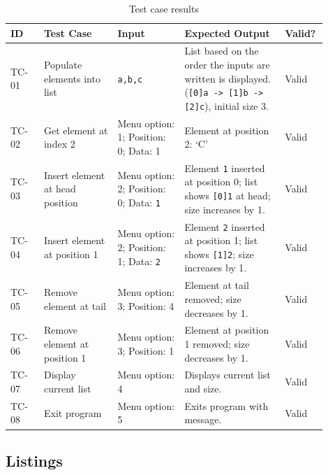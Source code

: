 \documentclass[12pt]{article}
\begin{document}
\begin{table}[H]
\centering
\begin{tabularx}{\linewidth}{@{}>{\raggedright\arraybackslash}p{0.10\linewidth}
                            >{\raggedright\arraybackslash}p{0.22\linewidth}
                            >{\raggedright\arraybackslash}p{0.20\linewidth}
                            >{\raggedright\arraybackslash}p{0.30\linewidth}
                            >{\raggedright\arraybackslash}p{0.08\linewidth}@{}}
\toprule
\textbf{ID} & \textbf{Test Case} & \textbf{Input} & \textbf{Expected Output} & \textbf{Valid?} \\
\midrule
TC-01 & Populate elements into list & \texttt{a,b,c} &
List based on the order the inputs are written is displayed.
(\texttt{[0]a -> [1]b -> [2]c}), initial size 3. &
Valid \\
\addlinespace
TC-02 & Get element at index 2 &
Menu option: 1; Position: 0; Data: 1 &
Element at position 2: ‘C’ &
Valid \\
\addlinespace
TC-03 & Insert element at head position &
Menu option: 2; Position: 0; Data: \texttt{1} &
Element \texttt{1} inserted at position 0; list shows \texttt{[0]1} at head; size increases by 1. &
Valid \\
\addlinespace
TC-04 & Insert element at position 1 &
Menu option: 2; Position: 1; Data: \texttt{2} &
Element \texttt{2} inserted at position 1; list shows \texttt{[1]2}; size increases by 1. &
Valid \\
\addlinespace
TC-05 & Remove element at tail &
Menu option: 3; Position: 4 &
Element at tail removed; size decreases by 1. &
Valid \\
\addlinespace
TC-06 & Remove element at position 1 &
Menu option: 3; Position: 1 &
Element at position 1 removed; size decreases by 1. &
Valid \\
\addlinespace
TC-07 & Display current list &
Menu option: 4 &
Displays current list and size. &
Valid \\
\addlinespace
TC-08 & Exit program &
Menu option: 5 &
Exits program with message. &
Valid \\

\bottomrule
\end{tabularx}
\caption{Test case results}
\end{table}

\newpage
\subsection{Listings}
\end{document}

